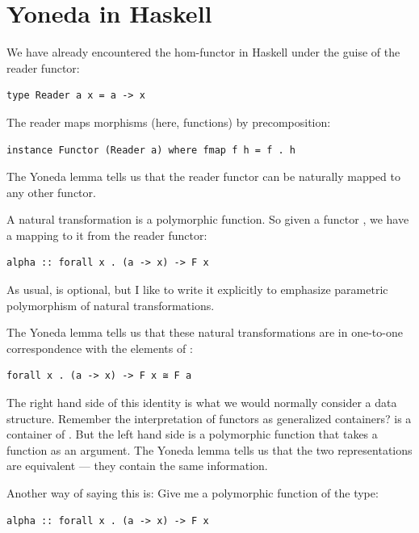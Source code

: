\section{Yoneda in Haskell}\label{yoneda-in-haskell}

We have already encountered the hom-functor in Haskell under the guise
of the reader functor:

\begin{verbatim}
type Reader a x = a -> x
\end{verbatim}

The reader maps morphisms (here, functions) by precomposition:

\begin{verbatim}
instance Functor (Reader a) where fmap f h = f . h
\end{verbatim}

The Yoneda lemma tells us that the reader functor can be naturally
mapped to any other functor.

A natural transformation is a polymorphic function. So given a functor
, we have a mapping to it from the reader functor:

\begin{verbatim}
alpha :: forall x . (a -> x) -> F x
\end{verbatim}

As usual,  is optional, but I like to write it explicitly
to emphasize parametric polymorphism of natural transformations.

The Yoneda lemma tells us that these natural transformations are in
one-to-one correspondence with the elements of :

\begin{verbatim}
forall x . (a -> x) -> F x ≅ F a
\end{verbatim}

The right hand side of this identity is what we would normally consider
a data structure. Remember the interpretation of functors as generalized
containers?  is a container of . But the left
hand side is a polymorphic function that takes a function as an
argument. The Yoneda lemma tells us that the two representations are
equivalent --- they contain the same information.

Another way of saying this is: Give me a polymorphic function of the
type:

\begin{verbatim}
alpha :: forall x . (a -> x) -> F x
\end{verbatim}

